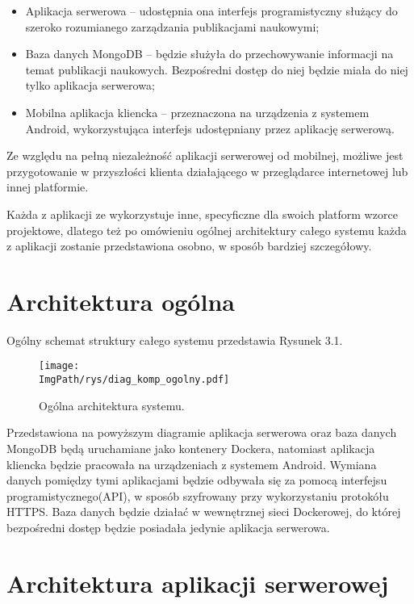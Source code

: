 \documentclass[a4paper,12pt,twoside,openany]{report}
\newcommand{\ImgPath}{.}
\begin{document}
\begin{itemize}
	\item Aplikacja serwerowa -- udostępnia ona interfejs programistyczny służący do szeroko rozumianego zarządzania publikacjami naukowymi; 
	\item Baza danych MongoDB -- będzie służyła do przechowywanie informacji na temat publikacji naukowych. Bezpośredni dostęp do niej będzie miała do niej tylko aplikacja serwerowa;
	\item Mobilna aplikacja kliencka -- przeznaczona na urządzenia z systemem Android, wykorzystująca interfejs udostępniany przez aplikację serwerową.
\end{itemize}

Ze względu na pełną niezależność aplikacji serwerowej od mobilnej, możliwe jest przygotowanie w przyszłości klienta działającego w przeglądarce internetowej lub innej platformie. 

Każda z aplikacji ze wykorzystuje inne, specyficzne dla swoich platform wzorce projektowe, dlatego też po omówieniu ogólnej architektury całego systemu  każda z aplikacji zostanie przedstawiona osobno, w sposób bardziej szczegółowy. 

\newpage
\section{Architektura ogólna}
Ogólny schemat struktury całego systemu przedstawia Rysunek 3.1.

 \begin{figure}[!htbp]
 	\begin{center}
 		\centering
 		\texttt{[image: \\ImgPath/rys/diag\_komp\_ogolny.pdf]}
 	\end{center}
 	\caption{Ogólna architektura systemu.}
 	\label{ogolnaArchitektura}
 \end{figure}
 Przedstawiona na powyższym diagramie aplikacja serwerowa oraz baza danych MongoDB będą uruchamiane jako kontenery Dockera, natomiast aplikacja kliencka będzie pracowała na urządzeniach z systemem Android. Wymiana danych pomiędzy tymi aplikacjami będzie odbywała się za pomocą interfejsu programistycznego(API), w sposób szyfrowany przy wykorzystaniu protokółu HTTPS.
 Baza danych będzie działać w wewnętrznej sieci Dockerowej, do której bezpośredni dostęp będzie posiadała jedynie aplikacja serwerowa. 

\section{Architektura aplikacji serwerowej}
\end{document}
